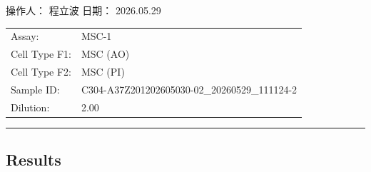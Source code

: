 \documentclass[UTF8,10pt,a4paper,fontset=fandol]{ctexart}
\newcommand{\fieldvalue}[1]{#1}
\newcommand{\handwritten}[1]{#1}
\begin{document}
\vfill

\noindent
操作人：
\fieldvalue{\handwritten{程立波}}
\hfill
日期：
\fieldvalue{\handwritten{2026.05.29}}

\newpage

\noindent
\begin{tabular}{@{}ll@{}}
Assay: &
\fieldvalue{MSC-1}
\\[3pt]
Cell Type F1: &
\fieldvalue{MSC (AO)}
\\[3pt]
Cell Type F2: &
\fieldvalue{MSC (PI)}
\\[3pt]
Sample ID: &
\fieldvalue{C304-A37Z201202605030-02\_20260529\_111124-2}
\\[3pt]
Dilution: &
\fieldvalue{2.00}
\end{tabular}

\vspace{0.5em}
\hrule
\vspace{0.5em}

\subsection*{Results}
\end{document}
